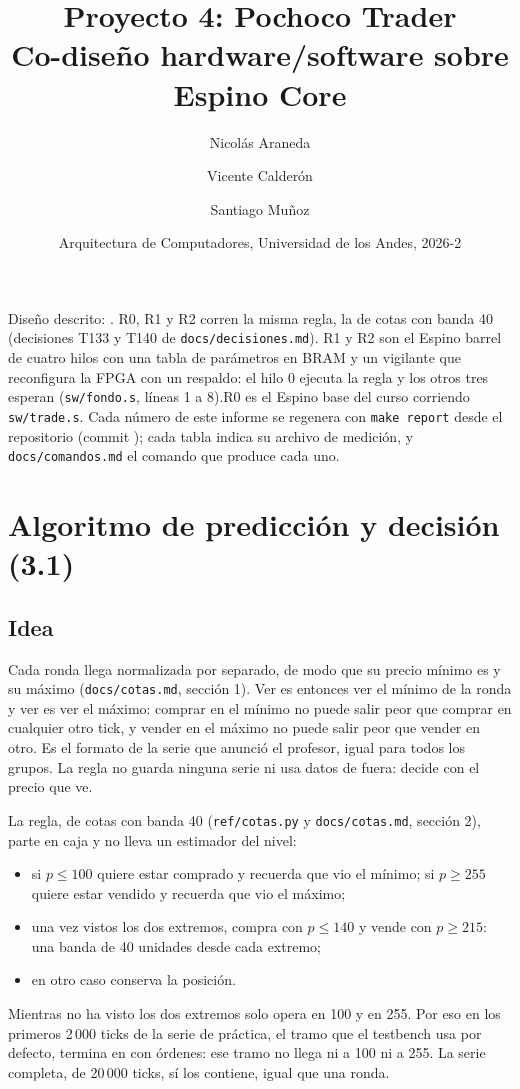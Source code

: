 \documentclass[11pt,a4paper]{article}
\title{Proyecto 4: Pochoco Trader\\\large Co-diseño hardware/software sobre Espino Core}
\author{Nicolás Araneda \and Vicente Calderón \and Santiago Muñoz}
\date{Arquitectura de Computadores, Universidad de los Andes, 2026-2}
\newcommand{\arch}[1]{\texttt{#1}}
\begin{document}
\maketitle

\ifpeldanotres

\else
\noindent Diseño descrito: \textbf{\cifraPeldano}. R0, R1 y R2 corren la misma regla, la de cotas con banda 40 (decisiones T133 y T140 de \arch{docs/decisiones.md}). \ifpeldanofondo R1 y R2 son el Espino barrel de cuatro hilos con una tabla de parámetros en BRAM\ifpeldanodos{} y un vigilante que reconfigura la FPGA con un respaldo\fi: el hilo 0 ejecuta la regla y los otros tres esperan (\arch{sw/fondo.s}, líneas 1 a 8).\else R0 es el Espino base del curso corriendo \arch{sw/trade.s}.\fi{} Cada número de este informe se regenera con \texttt{make report} desde el repositorio (commit \texttt{\commitinforme}); cada tabla indica su archivo de medición, y \arch{docs/comandos.md} el comando que produce cada uno.

\section{Algoritmo de predicción y decisión (3.1)}

\subsection{Idea}

Cada ronda llega normalizada por separado, de modo que su precio mínimo es \cifraPrecioMin{} y su máximo \cifraPrecioMax{} (\arch{docs/cotas.md}, sección 1). Ver \cifraPrecioMin{} es entonces ver el mínimo de la ronda y ver \cifraPrecioMax{} es ver el máximo: comprar en el mínimo no puede salir peor que comprar en cualquier otro tick, y vender en el máximo no puede salir peor que vender en otro. Es el formato de la serie que anunció el profesor, igual para todos los grupos. La regla no guarda ninguna serie ni usa datos de fuera: decide con el precio que ve.

La regla, de cotas con banda 40 (\arch{ref/cotas.py} y \arch{docs/cotas.md}, sección 2), parte en caja y no lleva un estimador del nivel:
\begin{itemize}
  \item si $p \le 100$ quiere estar comprado y recuerda que vio el mínimo; si $p \ge 255$ quiere estar vendido y recuerda que vio el máximo;
  \item una vez vistos los dos extremos, compra con $p \le 140$ y vende con $p \ge 215$: una banda de 40 unidades desde cada extremo;
  \item en otro caso conserva la posición.
\end{itemize}
Mientras no ha visto los dos extremos solo opera en 100 y en 255. Por eso en los primeros 2\,000 ticks de la serie de práctica, el tramo que el testbench usa por defecto, termina en \cifraPatrimonioDos{} con \cifraOrdenesDos{} órdenes: ese tramo no llega ni a 100 ni a 255. La serie completa, de 20\,000 ticks, sí los contiene, igual que una ronda.
\end{document}
